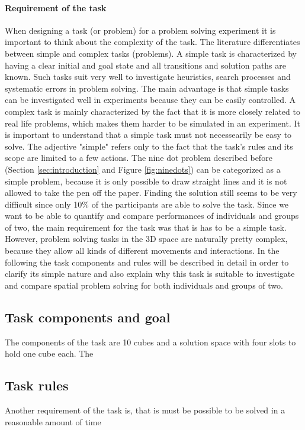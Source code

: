 \documentclass{article}
\begin{document}
\paragraph{Requirement of the task}
When designing a task (or problem) for a problem solving experiment it is important to think about the complexity of the task. The literature differentiates between simple and complex tasks (problems). A simple task is characterized by having a clear initial  and goal state and all transitions and solution paths are known. Such tasks suit very well to investigate heuristics, search processes and systematic errors in problem solving. The main advantage is that simple tasks can be investigated well in experiments because they can be easily controlled. A complex task is mainly characterized by the fact that it is more closely related to real life problems, which makes them harder to be simulated in an experiment. It is important to understand that a simple task must not necessearily be easy to solve. The adjective "simple" refers only to the fact that the task's rules and its scope are limited to a few actions. The nine dot problem described before (Section \ref{sec:introduction} and Figure \ref{fig:ninedots}) can be categorized as a simple problem, because it is only possible to draw straight lines and it is not allowed to take the pen off the paper. Finding the solution still seems to be very difficult since only 10\% of the participants are able to solve the task. \cite{muesseler2015allgemeine} 
Since we want to be able to quantify and compare performances of individuals and groups of two, the main requirement for the task  was that is has to be a simple task. However, problem solving tasks in the 3D space are naturally pretty complex, because they allow all kinds of different movements and interactions. In the following the task components and rules will be described in detail in order to clarify its simple nature and also explain why this task is suitable to investigate and compare spatial problem solving for both individuals and groups of two.

\subsection{Task components and goal}
The components of the task are 10 cubes and a solution space with four slots to hold one cube each. The

\subsection{Task rules}
Another requirement of the task is, that is must be possible to be solved in a reasonable amount of time 
\end{document}
